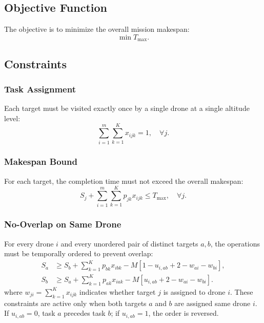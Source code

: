 \documentclass[subscriptcorrection,upint,nolists, varvw,barcolor=Goldenrod3,mathalfa=cal=euler,balance,hyphenate,french]{asmejour} %
\begin{document}
\subsection{Objective Function}
The objective is to minimize the overall mission makespan:
\begin{equation}
    \min T_{\max}.
\end{equation}

\subsection{Constraints}

\subsubsection{Task Assignment}
Each target must be visited exactly once by a single drone at a single altitude level:
\begin{equation}
    \sum_{i=1}^{m} \sum_{k=1}^{K} x_{ijk} = 1, \quad \forall j.
\end{equation}

\subsubsection{Makespan Bound}
For each target, the completion time must not exceed the overall makespan:
\begin{equation}
    S_j + \sum_{i=1}^{m} \sum_{k=1}^{K} p_{jk}x_{ijk} \le T_{\max}, \quad \forall j.
\end{equation}

\subsubsection{No-Overlap on Same Drone}
For every drone \(i\) and every unordered pair of distinct targets \(a,b\), the operations must be temporally ordered to prevent overlap:
\begin{align}
    S_a &\ge S_b + \sum_{k=1}^{K} p_{bk}x_{ibk} - M[1 - u_{i,ab}+2-w_{ai}-w_{bi}], \\
    S_b &\ge S_a + \sum_{k=1}^{K} p_{ak}x_{iak} - M [u_{i,ab}+2-w_{ai}-w_{bi}].
\end{align}
where  \(w_{ji} = \sum_{k=1}^{K} x_{ijk}\) indicates whether target \(j\) is assigned to drone \(i\). These constraints are active only when both targets \(a\) and \(b\) are assigned same drone \(i\).
If \(u_{i,ab}=0\), task \(a\) precedes task \(b\); if \(u_{i,ab}=1\), the order is reversed.
\end{document}
